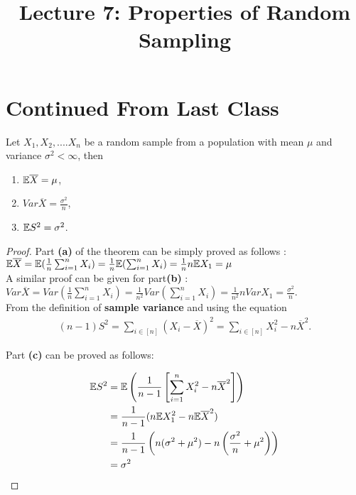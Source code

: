 \documentclass[a4paper,english,12pt]{article}
\title{ Lecture 7: Properties of Random Sampling }
\author{}
\begin{document}
\maketitle

\section{Continued From Last Class}
\begin{thm}
Let $X_1,X_2,....X_n$ be a random sample from a population with mean $\mu$ and variance $\sigma^2<\infty$, then 
\renewcommand{\labelenumi}{\alph{enumi})}
\begin{enumerate}
\item $\mathbb{E} \overline{X}=\mu$,
\item $Var \overline{X}= \frac{\sigma^2}{n}$,
\item $\mathbb{E} S^2=\sigma^2$.
\end{enumerate}

\end{thm}

\begin{proof}
Part \textbf{(a)} of the theorem can be simply proved as follows :\\

$\mathbb{E}\overline{X}=\mathbb{E}(\frac{1}{n}\sum_{i=1}^{n}X_i)=\frac{1}{n}\mathbb{E}(\sum_{i=1}^{n}X_i)=\frac{1}{n}n\mathbb{E} X_1=\mu$ \\

A similar proof can be given for part\textbf{(b)} : \\

$ Var\overline{X} =Var(\frac{1}{n}\sum_{i=1}^{n}X_i)=\frac{1}{n^2}Var(\sum_{i=1}^{n}X_i)=\frac{1}{n^2}nVarX_1=\frac{\sigma^2}{n}$. \\

From the definition of \textbf{sample variance} and using the equation 
\begin{align}
(n-1)S^2=\sum_{i\in [n]}(X_i-\overline{X})^2=\sum_{i\in [n]}X_i^2-n\overline{X}^2.
\end{align}

Part \textbf{(c)} can be proved as follows:


\begin{align}
\mathbb{E} S^2&=\mathbb{E} \left(\frac{1}{n-1}\left[\sum_{i=1}^{n}X_i^2-n\overline{X}^2\right]\right) \nonumber \\
&=\frac{1}{n-1}(n\mathbb{E} X_1^2-n\mathbb{E}\overline{X}^2) \nonumber \\
&=\frac{1}{n-1}\left(n(\sigma^2+\mu^2)-n\left(\frac{\sigma^2}{n}+\mu^2\right)\right) \nonumber\\
&=\sigma^2
\end{align}

\end{proof}
\end{document}
